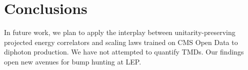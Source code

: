 \section{Conclusions}\label{sec:conclusions}

In future work, we plan to apply the interplay between
unitarity-preserving projected energy correlators and scaling laws
trained on CMS Open Data to diphoton production. We have not attempted
to quantify TMDs. Our findings open new avenues for bump hunting at LEP.

